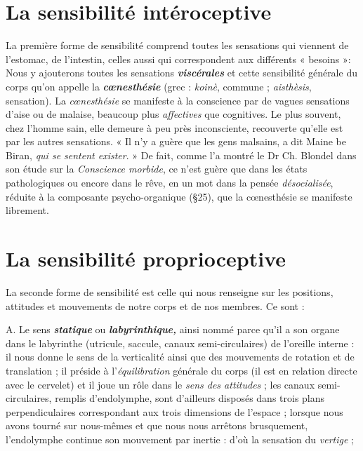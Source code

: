 \section{La sensibilité intéroceptive}%
La première forme de sensibilité
comprend toutes les sensations qui viennent de l’estomac,
de l'intestin, celles aussi qui correspondent aux différents « besoins »:
Nous y ajouterons toutes les sensations \textbf{\textit {viscérales}} et cette sensibilité
générale du corps qu’on appelle la \textbf{\textit {cœnesthésie}} (grec : {\it koinè}, commune ;
{\it aisthèsis}, sensation). La {\it cœnesthésie} se manifeste à la conscience
par de vagues sensations d’aise ou de malaise, beaucoup plus {\it affectives}
que cognitives. Le plus souvent, chez l’homme sain, elle demeure à peu
près inconsciente, recouverte qu’elle est par les autres sensations. « Il
n'y a guère que les gens malsains, a dit Maine be Biran, {\it qui se sentent
exister}. » De fait, comme l’a montré le Dr Ch. Blondel dans son
étude sur la {\it Conscience morbide}, ce n’est guère que dans les états
pathologiques ou encore dans le rêve, en un mot dans la pensée
{\it désocialisée}, réduite à la composante psycho-organique (\S 25), que la
cœnesthésie se manifeste librement.

\section{La sensibilité proprioceptive}%
La seconde forme de sensibilité
est celle qui nous renseigne sur les positions, attitudes et mouvements
de notre corps et de nos membres. Ce sont :

A. Le sens \textbf{\textit {statique}} ou \textbf{\textit {labyrinthique,}} ainsi nommé parce qu’il
a son organe dans le labyrinthe (utricule, saccule, canaux semi-circulaires)
de l’oreille interne : il nous donne le sens de la verticalité
ainsi que des mouvements de rotation et de translation ; il préside à
l’{\it équilibration} générale du corps (il est en relation directe avec le
cervelet) et il joue un rôle dans le {\it sens des attitudes} ; les canaux
semi-circulaires, remplis d’endolymphe, sont d’ailleurs disposés dans
trois plans perpendiculaires correspondant aux trois dimensions de
l’espace ; lorsque nous avons tourné sur nous-mêmes et que nous
nous arrêtons brusquement, l’endolymphe continue son mouvement
par inertie : d’où la sensation du {\it vertige} ;

